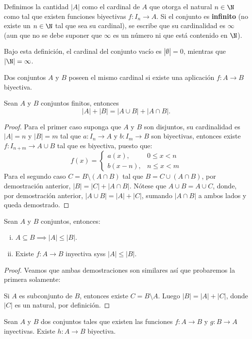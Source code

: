 \documentclass[11pt,oneside,a4paper]{book}
\begin{document}
\begin{mydef}[Cardinalidad]
Definimos la cantidad $|A|$ como el cardinal de $A$ que otorga el natural $n\in\N$ como tal que existen funciones biyectivas $f:I_n\rightarrow A$. Si el conjunto es \textbf{infinito} (no existe un $n\in\N$ tal que sea su cardinal), se escribe que su cardinalidad es $\infty$ (aun que no se debe suponer que $\infty$ es un número ni que está contenido en $\N$).
\end{mydef}
Bajo esta definición, el cardinal del conjunto vacío es $|\emptyset|=0$, mientras que $|\N|=\infty$.
\begin{cor}
Dos conjuntos $A$ y $B$ poseen el mismo cardinal si existe una aplicación $f:A\rightarrow B$ biyectiva.
\end{cor}
\begin{thm}\label{thm:card-sum}
Sean $A$ y $B$ conjuntos finitos, entonces
$$|A|+|B|=|A\cup B|+|A\cap B|.$$
\end{thm}
\begin{proof}
Para el primer caso suponga que $A$ y $B$ son disjuntos, su cardinalidad es $|A|=n$ y $|B|=m$ tal que $a:I_n\rightarrow A$ y $b:I_m\rightarrow B$ son biyectivas, entonces existe $f:I_{n+m}\rightarrow A\cup B$ tal que es biyectiva, puesto que:
$$f(x)=\begin{cases}
a(x),& 0\leq x\lt n\\
b(x-n),& n\leq x\lt m
\end{cases}$$
Para el segundo caso $C=B\setminus(A\cap B)$ tal que $B=C\cup(A\cap B)$, por demostración anterior, $|B|=|C|+|A\cap B|$. Nótese que $A\cup B=A\cup C$, donde, por demostración anterior, $|A\cup B|=|A|+|C|$, sumando $|A\cap B|$ a ambos lados y queda demostrado.
\end{proof}
\begin{cor}
Sean $A$ y $B$ conjuntos, entonces:
\begin{enumerate}[i)]
\item $A\subseteq B\implies |A|\leq|B|$.
\item Existe $f:A\rightarrow B$ inyectiva syss $|A|\leq|B|$.
\end{enumerate}
\end{cor}
\begin{proof}
Veamos que ambas demostraciones son similares así que probaremos la primera solamente:

Si $A$ es subconjunto de $B$, entonces existe $C=B\setminus A$. Luego $|B|=|A|+|C|$, donde $|C|$ es un natural, por definición.
\end{proof}
\begin{thm}
Sean $A$ y $B$ dos conjuntos tales que existen las funciones $f:A\rightarrow B$ y $g:B\rightarrow A$ inyectivas. Existe $h:A\rightarrow B$ biyectiva.
\end{thm}
\end{document}
